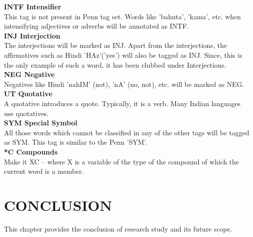 \documentclass[12pt,a4paper,oneside]{memoir}
\begin{document}
\textbf{INTF Intensifier}\\

This tag is not present in Penn tag set. Words like 'bahuta', 'kama', etc. when
intensifying adjectives or adverbs will be annotated as INTF. \\

\textbf{INJ Interjection }\\

The interjections will be marked as INJ. Apart from the interjections, the
affirmatives such as Hindi 'HAz'('yes') will also be tagged as INJ. Since, this is
the only example of such a word, it has been clubbed under Interjections. \\

\textbf{NEG Negative }\\

Negatives like Hindi 'nahIM' (not), 'nA' (no, not), etc. will be marked as NEG.\\

\textbf{UT Quotative}\\

A quotative introduces a quote. Typically, it is a verb. Many Indian languages
use quotatives.\\

\textbf{SYM Special Symbol}\\

All those words which cannot be classified in any of the other tags will be
tagged as SYM. This tag is similar to the Penn 'SYM'.\\

\textbf{*C Compounds }\\

Make it XC – where X is a variable of the
type of the compound of which the current word is a member.\\
\textbf{}
\textbf{}
\textbf{}
\textbf{}

\chapter{CONCLUSION}
This chapter provides the conclusion of research study and its future scope.
\end{document}
